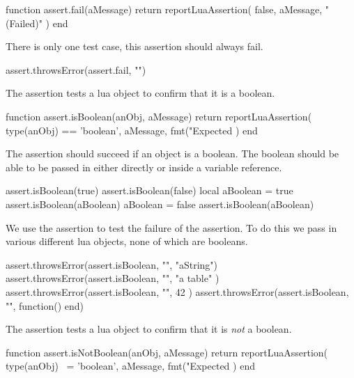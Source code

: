 \startLuaCode
function assert.fail(aMessage)
  return reportLuaAssertion(
    false,
    aMessage,
    "(Failed)"
  )
end
\stopLuaCode


There is only one test case, this assertion should always fail.

\startLuaTest
  assert.throwsError(assert.fail, "")
\stopLuaTest
\stopTestCase

\stopTestSuite


The  assertion tests a lua object to confirm that 
it is a boolean. 

\startLuaCode
function assert.isBoolean(anObj, aMessage)
  return reportLuaAssertion(
    type(anObj) == 'boolean',
    aMessage,
    fmt("Expected %
  )
end
\stopLuaCode


The  assertion should succeed if an object is a 
boolean. The boolean should be able to be passed in either directly or 
inside a variable reference. 

\startLuaTest
  assert.isBoolean(true)
  assert.isBoolean(false)
  local aBoolean = true
  assert.isBoolean(aBoolean)
  aBoolean = false
  assert.isBoolean(aBoolean)
\stopLuaTest
\stopTestCase


We use the  assertion to test the failure of the 
 assertion. To do this we pass in various different 
lua objects, none of which are booleans. 

\startLuaTest
  assert.throwsError(assert.isBoolean, "", "aString")
  assert.throwsError(assert.isBoolean, "", { "a table" })
  assert.throwsError(assert.isBoolean, "", 42 )
  assert.throwsError(assert.isBoolean, "", function() end)
\stopLuaTest
\stopTestCase

\stopTestSuite


The  assertion tests a lua object to confirm 
that it is \emph{not} a boolean. 

\startLuaCode
function assert.isNotBoolean(anObj, aMessage)
  return reportLuaAssertion(
    type(anObj) ~= 'boolean',
    aMessage,
    fmt("Expected %
  )
end
\stopLuaCode

